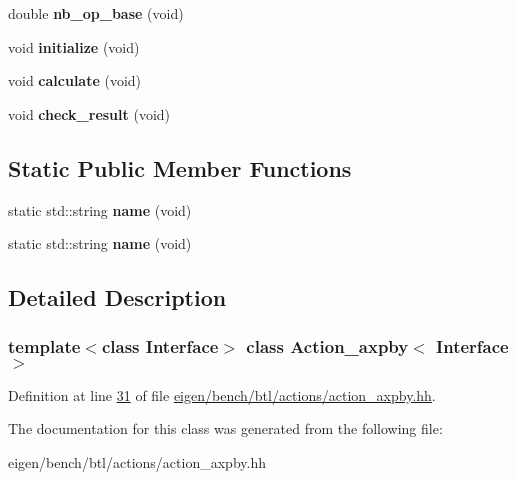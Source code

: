 \begin{DoxyCompactItemize}
double {\bfseries nb\+\_\+op\+\_\+base} (void)
\item 
\mbox{\label{class_action__axpby_abbb5ab370440a34f86034b9baa721796}} 
void {\bfseries initialize} (void)
\item 
\mbox{\label{class_action__axpby_afb3186f69d3fee352beb40d0b300b831}} 
void {\bfseries calculate} (void)
\item 
\mbox{\label{class_action__axpby_ae30b2fa4dffb28b723488ddd32a5532b}} 
void {\bfseries check\+\_\+result} (void)
\end{DoxyCompactItemize}
\subsection*{Static Public Member Functions}
\begin{DoxyCompactItemize}
\item 
\mbox{\label{class_action__axpby_a7baf0b095184b8ebfa865737e83441e0}} 
static std\+::string {\bfseries name} (void)
\item 
\mbox{\label{class_action__axpby_a7baf0b095184b8ebfa865737e83441e0}} 
static std\+::string {\bfseries name} (void)
\end{DoxyCompactItemize}


\subsection{Detailed Description}
\subsubsection*{template$<$class Interface$>$\newline
class Action\+\_\+axpby$<$ Interface $>$}



Definition at line \hyperlink{eigen_2bench_2btl_2actions_2action__axpby_8hh_source_l00031}{31} of file \hyperlink{eigen_2bench_2btl_2actions_2action__axpby_8hh_source}{eigen/bench/btl/actions/action\+\_\+axpby.\+hh}.



The documentation for this class was generated from the following file\+:\begin{DoxyCompactItemize}
\item 
eigen/bench/btl/actions/action\+\_\+axpby.\+hh\end{DoxyCompactItemize}
